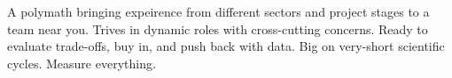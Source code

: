 \documentclass[9pt]{developercv} %
\begin{document}
\vspace{0.5cm} %



\begin{minipage}[t]{0.4\textwidth} %
	\vspace{-\baselineskip} %
	
	A polymath bringing expeirence from different sectors and project stages to a team near you.
	Trives in dynamic roles with cross-cutting concerns. Ready to evaluate trade-offs, buy in, and push back with data. Big on very-short scientific cycles. Measure everything.
\end{minipage}
\hfill %
\begin{minipage}[t]{0.5\textwidth} %
	\vspace{-\baselineskip} %
	
	\begin{barchart}{5.5} %
	\end{barchart}
\end{minipage}

\begin{center}
\end{center}


\end{document}
